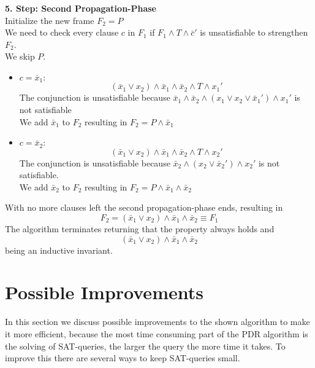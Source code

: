 \documentclass[11pt, a4paper, BCOR=10mm, ngerman]{scrbook}
\begin{document}
\textbf{5. Step: Second Propagation-Phase} \\
Initialize the new frame $F_2 = P$ \\
We need to check every clause $c$ in $F_1$ if $F_1 \land T \land \bar c'$ is unsatisfiable to strengthen $F_2$.\\ We  skip $P$. 
\begin{itemize}
\item $c = \bar x_1:$
\begin{equation*}
(\bar x_1 \lor x_2) \land \bar x_1 \land \bar x_2 \land T \land x_1'
\end{equation*}
The conjunction is unsatisfiable because $\bar x_1 \land \bar x_2 \land (x_1 \lor x_2 \lor \bar x_1') \land x_1'$ is not satisfiable \\
We add $\bar x_1$ to $F_2$ resulting in
$F_2 = P \land \bar x_1$ \\

\item $c = \bar x_2:$ 
\begin{equation*}
(\bar x_1 \lor x_2) \land \bar x_1 \land \bar x_2 \land T \land x_2'
\end{equation*}
The conjunction is unsatisfiable because $\bar x_2 \land (x_2 \lor \bar x_2') \land x_2'$ is not satisfiable. \\
We add $\bar x_2$ to $F_2$ resulting in
$F_2 = P \land \bar x_1 \land \bar x_2$

\end{itemize}

With no more clauses left the second propagation-phase ends, resulting in 
\begin{equation*}
F_2 = (\bar x_1 \lor x_2) \land \bar x_1 \land \bar x_2 \equiv F_1
\end{equation*}
The algorithm terminates returning that the property always holds and
\begin{equation*}
(\bar x_1 \lor x_2) \land \bar x_1 \land \bar x_2
\end{equation*}
 being an inductive invariant.

\section{Possible Improvements}
In this section we discuss possible improvements to the shown algorithm to make it more efficient, because
the most time consuming part of the PDR algorithm is the solving of SAT-queries, the larger the query the more time it takes. To improve this there are several ways to keep SAT-queries small.
\end{document}
